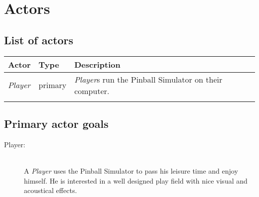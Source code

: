 \documentclass[fontsize=12pt,
               paper=a4,
               twoside=false,
               parskip=half,
               ]{scrartcl}
\begin{document}
\newcommand{\doctitle}{Use Case Model}


\tableofcontents


\section{Actors}

\subsection{List of actors}

\begin{tabular}{llp{9cm}}
\toprule
\textbf{Actor} & \textbf{Type} & \textbf{Description} \\ 
\midrule
\emph{Player} & primary & \emph{Player}s run the Pinball Simulator on their computer.\\

\\ 
\bottomrule 
\end{tabular} 

\subsection{Primary actor goals}

\begin{description}

\item[Player:] \hfill \\
A \emph{Player} uses the Pinball Simulator to pass his leisure time and enjoy himself. He is interested in a well designed play field with nice visual and acoustical effects.


\end{description}
\end{document}
